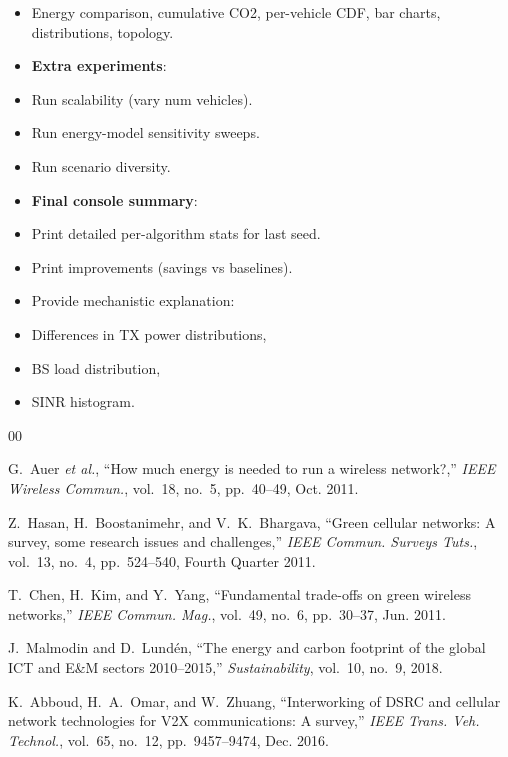 \documentclass[conference]{IEEEtran}
\begin{document}
\begin{itemize}
\item Energy comparison, cumulative CO2, per-vehicle CDF, bar charts, distributions, topology.
\item \textbf{Extra experiments}:
\item Run scalability (vary num vehicles).
\item Run energy-model sensitivity sweeps.
\item Run scenario diversity.
\item \textbf{Final console summary}:
\item Print detailed per-algorithm stats for last seed.
\item Print improvements (savings vs baselines).
\item Provide mechanistic explanation:
\item Differences in TX power distributions,
\item BS load distribution,
\item SINR histogram.
\end{itemize}




\begin{thebibliography}{00}

G.~Auer \emph{et al.}, ``How much energy is needed to run a wireless network?,'' \emph{IEEE Wireless Commun.}, vol.~18, no.~5, pp.~40--49, Oct. 2011.

Z.~Hasan, H.~Boostanimehr, and V.~K.~Bhargava, ``Green cellular networks: A survey, some research issues and challenges,'' \emph{IEEE Commun. Surveys Tuts.}, vol.~13, no.~4, pp.~524--540, Fourth Quarter 2011.

T.~Chen, H.~Kim, and Y.~Yang, ``Fundamental trade-offs on green wireless networks,'' \emph{IEEE Commun. Mag.}, vol.~49, no.~6, pp.~30--37, Jun. 2011.

J.~Malmodin and D.~Lund\'{e}n, ``The energy and carbon footprint of the global ICT and E\&M sectors 2010--2015,'' \emph{Sustainability}, vol.~10, no.~9, 2018.

K.~Abboud, H.~A.~Omar, and W.~Zhuang, ``Interworking of DSRC and cellular network technologies for V2X communications: A survey,'' \emph{IEEE Trans. Veh. Technol.}, vol.~65, no.~12, pp.~9457--9474, Dec. 2016.

\end{thebibliography}
\end{document}
